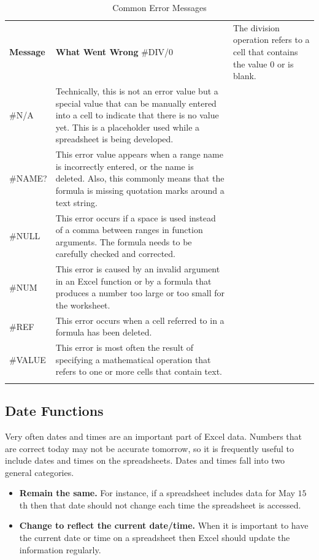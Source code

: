 \begin{table}[H]
	{\small
		\begin{longtable}{L{0.60in}L{3.65in}} %
			\textbf{Message} & \textbf{What Went Wrong} \endhead
			\hline
			\#DIV/$ 0 $ & The division operation refers to a cell that contains the value $ 0 $ or is blank.\\
			\#N/A & Technically, this is not an error value but a special value 		that can be manually entered into a cell to indicate that there is no value yet. This is a placeholder used while a spreadsheet is being developed.\\
			\#NAME? & This error value appears when a range name is incorrectly entered, or the name is deleted. Also, this commonly means that the formula is missing quotation marks around a text string.\\
			\#NULL & This error occurs if a space is used instead of a comma between ranges in function arguments. The formula needs to be carefully checked and corrected.\\
			\#NUM & This error is caused by an invalid argument in an Excel	function or by a formula that produces a number too large or too small for the worksheet.\\
			\#REF & This error occurs when a cell referred to in a formula has been deleted.\\
			\#VALUE & This error is most often the result of specifying a mathematical operation that refers to one or more cells that contain text.\\
			\caption{Common Error Messages}
			\label{03:tab01}
		\end{longtable}
	} %
\end{table}

\subsection{Date Functions}

Very often dates and times are an important part of Excel data. Numbers that are correct today may not be accurate tomorrow, so it is frequently useful to include dates and times on the spreadsheets. Dates and times fall into two general categories.

\begin{itemize}
	\item \textbf{Remain the same.} For instance, if a spreadsheet includes data for May $ 15 $th then that date should not change each time the spreadsheet is accessed.
	\item \textbf{Change to reflect the current date/time.} When it is important to have the current date or time on a spreadsheet then Excel should update the information regularly.
\end{itemize}

